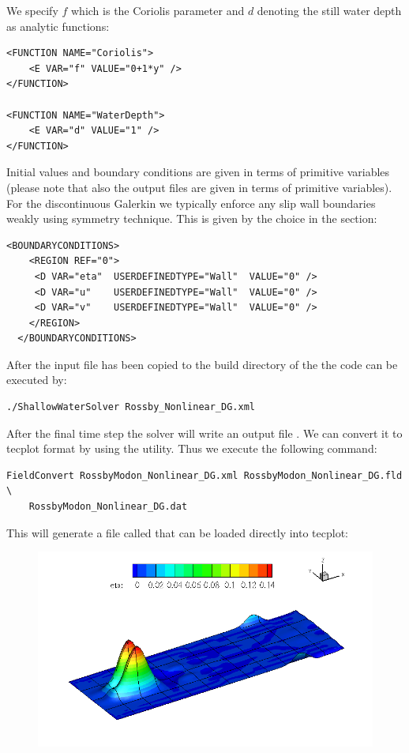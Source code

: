 We specify $f$ which is the Coriolis parameter and $d$ denoting the
still water depth as analytic functions:
\begin{lstlisting}[style=XmlStyle]
<FUNCTION NAME="Coriolis">
    <E VAR="f" VALUE="0+1*y" />
</FUNCTION>

<FUNCTION NAME="WaterDepth">
    <E VAR="d" VALUE="1" />
</FUNCTION>
\end{lstlisting}

Initial values and boundary conditions are given in terms of primitive variables
(please note that also the output files are given in terms of primitive
variables). For the discontinuous Galerkin we typically enforce any slip wall boundaries
weakly using symmetry technique. This is given by the
 choice in the 
section:
\begin{lstlisting}[style=XmlStyle]
  <BOUNDARYCONDITIONS>
    <REGION REF="0">
     <D VAR="eta"  USERDEFINEDTYPE="Wall"  VALUE="0" />
     <D VAR="u"    USERDEFINEDTYPE="Wall"  VALUE="0" />
     <D VAR="v"    USERDEFINEDTYPE="Wall"  VALUE="0" />
    </REGION>
  </BOUNDARYCONDITIONS>
\end{lstlisting}


After the input file has been copied to the build directory
of the  the code can be executed by:
\begin{lstlisting}[style=BashInputStyle]
 ./ShallowWaterSolver Rossby_Nonlinear_DG.xml
\end{lstlisting}

After the final time step the solver will write an output file 
. We can convert it to tecplot
format by using the  utility. Thus we execute the
following command:
\begin{lstlisting}[style=BashInputStyle]
FieldConvert RossbyModon_Nonlinear_DG.xml RossbyModon_Nonlinear_DG.fld \
    RossbyModon_Nonlinear_DG.dat
\end{lstlisting}
This will generate a file called  that
can be loaded directly into tecplot:

\begin{figure}
\includegraphics[width=\linewidth]{img/RossbyModon.png}
\end{figure}
